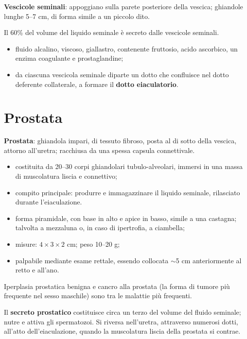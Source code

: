 \textbf{Vescicole seminali}: appoggiano sulla parete posteriore della vescica; ghiandole lunghe
5--7 cm, di forma simile a un piccolo dito.

Il 60\% del volume del liquido seminale è secreto dalle vescicole seminali.
\begin{itemize}
  \item fluido alcalino, viscoso, giallastro, contenente fruttosio, acido ascorbico, un enzima
    coagulante e prostaglandine;
  \item da ciascuna vescicola seminale diparte un dotto che confluisce nel dotto deferente
    collaterale, a formare il \textbf{dotto eiaculatorio}.
\end{itemize}

\section{Prostata}

\textbf{Prostata}: ghiandola impari, di tessuto fibroso, posta al di sotto della vescica, attorno
all'uretra; racchiusa da una spessa capsula connettivale.
\begin{itemize}
  \item costituita da 20--30 corpi ghiandolari tubulo-alveolari, immersi in una massa di
    muscolatura liscia e connettivo;
  \item compito principale: produrre e immagazzinare il liquido seminale, rilasciato durante
    l'eiaculazione.
\end{itemize}

\begin{itemize}
  \item forma piramidale, con base in alto e apice in basso, simile a una castagna; talvolta a
    mezzaluna o, in caso di ipertrofia, a ciambella;
  \item misure: $4 \times 3 \times 2$ cm; peso 10--20 g;
  \item palpabile mediante esame rettale, essendo collocata $\sim$5 cm anteriormente al retto e
    all'ano.
\end{itemize}

Iperplasia prostatica benigna e cancro alla prostata (la forma di tumore più frequente nel sesso
maschile) sono tra le malattie più frequenti.

Il \textbf{secreto prostatico} costituisce circa un terzo del volume del fluido seminale; nutre e
attiva gli spermatozoi. Si riversa nell'uretra, attraverso numerosi dotti, all'atto
dell'eiaculazione, quando la muscolatura liscia della prostata si contrae.


